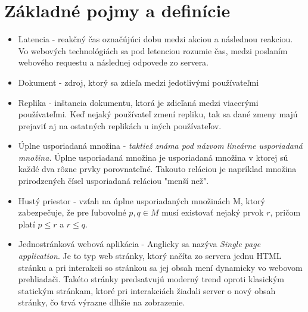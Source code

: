 \chapter{Základné pojmy a definície}

\label{kap:zakladne} %

\begin{itemize}
\item Latencia - reakčný čas označújúci dobu medzi akciou a následnou reakciou. Vo webových 
technológiách sa pod letenciou rozumie čas, medzi poslaním webového requestu a následnej
odpovede zo servera.
\item Dokument - zdroj, ktorý sa zdieľa medzi jedotlivými používateľmi
\item Replika - inštancia dokumentu, ktorá je zdieľaná medzi viacerými používateľmi. Keď nejaký
používateľ zmení repliku, tak sa dané zmeny majú prejaviť aj na ostatných replikách u iných
používateľov.
\item Úplne usporiadaná množina - \textit{taktiež známa pod názvom lineárne usporiadaná množina.} 
Úplne usporiadaná množina je usporiadaná množina v ktorej sú každé dva rôzne prvky porovnateľné. 
Takouto reláciou je napríklad množina prirodzených čísel usporiadaná reláciou "menší než".
\item Hustý priestor - vzťah na úplne usporiadaných množinách M, ktorý zabezpečuje, že pre 
ľubovolné $p, q \in M$ musí existovať nejaký prvok $r$, pričom platí $p \leq r$ a 
$r \leq q$.
\item Jednostránková webová aplikácia - Anglicky sa nazýva \textit{Single page application}. Je to
typ web stránky, ktorý načíta zo servera jednu HTML stránku a pri interakcii so stránkou sa jej 
obsah mení dynamicky vo webovom prehliadači. Takéto stránky predsatvujú moderný trend oproti
klasickým statickým stránkam, ktoré pri interakciách žiadali server o nový obsah stránky, čo
trvá výrazne dlhšie na zobrazenie.
\end{itemize}
